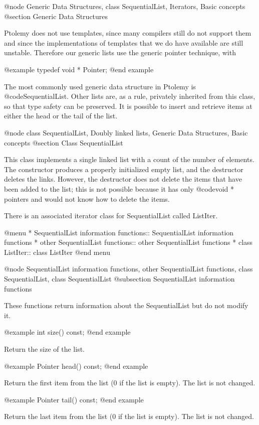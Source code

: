 @node Generic Data Structures, class SequentialList, Iterators, Basic concepts
@section Generic Data Structures

Ptolemy does not use templates, since many compilers still do not support them
and since the implementations of templates that we do have available
are still unstable.  Therefore our generic lists use the generic pointer
technique, with

@example
typedef void * Pointer;
@end example

The most commonly used generic data structure in Ptolemy is
@code{SequentialList}.  Other lists are, as a rule, privately inherited
from this class, so that type safety can be preserved.  It is possible
to insert and retrieve items at either the head or the tail of the list.

@node class SequentialList, Doubly linked lists, Generic Data Structures, Basic concepts
@section Class SequentialList

This class implements a single linked list with a count of the number of
elements.  The constructor produces a properly initialized empty list,
and the destructor deletes the links.  However, the destructor does
not delete the items that have been added to the list; this is not
possible because it has only @code{void *} pointers and would not know
how to delete the items.

There is an associated iterator class for SequentialList called ListIter.

@menu
* SequentialList information functions::  SequentialList information functions
* other SequentialList functions::  other SequentialList functions
* class ListIter::              class ListIter
@end menu

@node SequentialList information functions, other SequentialList functions, class SequentialList, class SequentialList
@subsection SequentialList information functions

These functions return information about the SequentialList but do not
modify it.

@example
int size() const;
@end example

Return the size of the list.

@example
Pointer head() const;
@end example

Return the first item from the list (0 if the list is empty).  The
list is not changed.

@example
Pointer tail() const;
@end example

Return the last item from the list (0 if the list is empty).  The
list is not changed.

